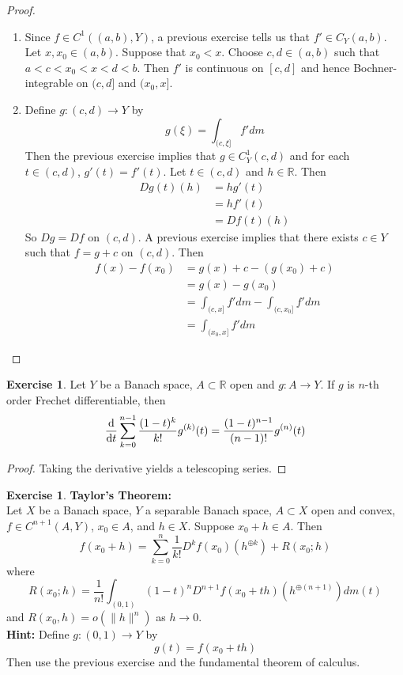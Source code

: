 \documentclass[12pt]{amsart}
\theoremstyle{definition}
\newtheorem{ex}[definition]{Exercise}
\newcommand{\R}{\mathbb{R}}
\newcommand{\lex}[1]{\label{ex:#1}}
\begin{document}
	\begin{proof}
	\begin{enumerate}
	\item Since $f \in C^1((a,b), Y)$, a previous exercise tells us that $f' \in C_Y(a,b)$. Let $x, x_0 \in (a,b)$. Suppose that $x_0 < x$. Choose $c,d \in (a,b)$ such that $a < c < x_0< x< d < b$. Then $f'$ is continuous on $[c,d]$ and hence Bochner-integrable on $(c,d]$ and $(x_0,x]$. 
	\item Define $g: (c,d) \rightarrow Y$ by $$g(\xi) = \int_{(c, \xi]}f'dm$$
	Then the previous exercise implies that $g \in C^1_Y(c,d)$ and for each $t \in (c, d)$, $g'(t) = f'(t)$. Let $t \in (c,d)$ and $h \in \R$. Then
	\begin{align*}
	Dg(t)(h) 
	&= hg'(t) \\
	&= hf'(t) \\
	&= Df(t)(h)
	\end{align*}
	So $Dg = Df$ on $(c,d)$. A previous exercise implies that there exists $c \in Y$ such that $f = g + c$ on $(c, d)$. Then 
	\begin{align*}
	f(x) - f(x_0)
	&= g(x)+c - (g(x_0)+c) \\
	&= g(x) - g(x_0) \\
	&= \int_{(c, x]}f'dm - \int_{(c, x_0]}f'dm\\
	&= \int_{(x_0, x]}f'dm
	\end{align*}
	\end{enumerate}
	\end{proof}
	
	
	\begin{ex} \lex{}
	Let $Y$ be a Banach space, $A \subset \R$ open and $g:A \rightarrow Y$. If $g$ is $n$-th order Frechet differentiable, then 
	$$\dv{t} \sum_{k=0}^{n-1} \frac{(1-t)^k}{k!}g^{(k)}(t) = \frac{(1-t)^{n-1}}{(n-1)!}g^{(n)}(t)$$
	\end{ex}
	
	\begin{proof}
	Taking the derivative yields a telescoping series.
	\end{proof}
	
	
	
	\begin{ex} \lex{}\textbf{Taylor's Theorem:}\\
	Let $X$ be a Banach space, $Y$ a separable Banach space, $A \subset X$ open and convex, $f\in C^{n+1}(A, Y)$, $x_0 \in A$, and $h \in X$. Suppose $x_0 + h \in A$. Then $$f(x_0 + h) = \sum_{k=0}^{n} \frac{1}{k!} D^k f(x_0)(h^{\oplus k}) + R(x_0;h)$$ 
	where $$R(x_0;h) = \frac{1}{n!}\int_{(0,1)} (1-t)^{n}D^{n+1}f(x_0 + th)(h^{\oplus (n+1)})d m(t)$$
	and $R(x_0, h) = o(\|h\|^{n})$ as $h \rightarrow 0$.\\
	\textbf{Hint:} Define $g: (0,1) \rightarrow Y$ by $$g(t) = f(x_0 +t h)$$ Then use the previous exercise and the fundamental theorem of calculus.
	\end{ex}
	
\end{document}
